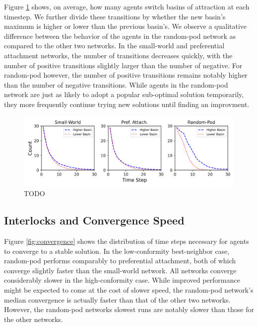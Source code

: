 \documentclass[manuscript,screen,review,acmsmall]{acmart}
\begin{document}
Figure \ref{fig:transitions} shows, on average,
how many agents switch basins of attraction at each timestep.
We further divide these transitions by whether the new basin's maximum is
higher or lower than the previous basin's.
We observe a qualitative difference between the behavior of the agents in the
random-pod network as compared to the other two networks.
In the small-world and preferential attachment networks,
the number of transitions decreases quickly, with the number of positive
transitions slightly larger than the number of negative.
For random-pod however,
the number of positive transitions remains notably higher than the number
of negative transitions.
While agents in the random-pod network are just as likely to adopt
a popular sub-optimal solution temporarily,
they more frequently continue trying new solutions until finding an
improvment.

\begin{figure}
\begin{center}
\includegraphics[width=5in]{fig-conform-transition-basin.png}
\caption{TODO}
\label{fig:transitions}
\begin{description}
\end{description}
\end{center}
\end{figure}

\subsection{Interlocks and Convergence Speed}
Figure \ref{fig:convergence} shows the distribution of time steps necessary for agents to converge to a stable solution.
In the low-conformity best-neighbor case,
random-pod performs comparably to preferential attachment,
both of which converge slightly faster than the small-world network.
All networks converge considerably slower in the high-conformity case.
While improved performance might be expected to come at the cost of slower
speed,
the random-pod network's median convergence is actually faster than that of the other two networks.
However, the random-pod networks slowest runs are notably slower than those for the other networks.
\end{document}
